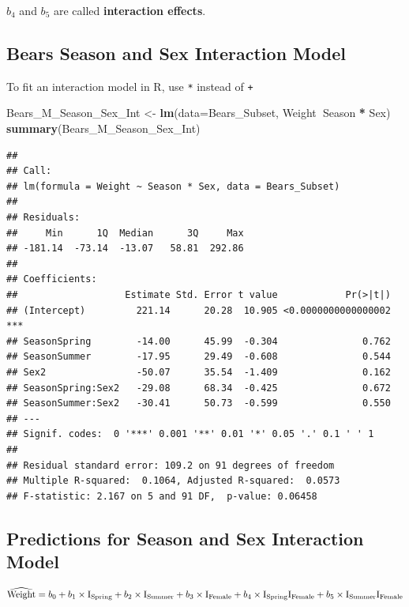 \documentclass[]{book}
\newenvironment{Shaded}{\begin{snugshade}}{\end{snugshade}}
\newcommand{\KeywordTok}[1]{\textcolor[rgb]{0.13,0.29,0.53}{\textbf{#1}}}
\newcommand{\DataTypeTok}[1]{\textcolor[rgb]{0.13,0.29,0.53}{#1}}
\newcommand{\StringTok}[1]{\textcolor[rgb]{0.31,0.60,0.02}{#1}}
\newcommand{\OperatorTok}[1]{\textcolor[rgb]{0.81,0.36,0.00}{\textbf{#1}}}
\newcommand{\NormalTok}[1]{#1}
\begin{document}
\(b_4\) and \(b_5\) are called \textbf{interaction effects}.

\subsection{Bears Season and Sex Interaction
Model}\label{bears-season-and-sex-interaction-model}

To fit an interaction model in R, use \texttt{*} instead of \texttt{+}

\begin{Shaded}
\begin{Highlighting}[]
\NormalTok{Bears_M_Season_Sex_Int <-}\StringTok{ }\KeywordTok{lm}\NormalTok{(}\DataTypeTok{data=}\NormalTok{Bears_Subset, Weight}\OperatorTok{~}\NormalTok{Season }\OperatorTok{*}\StringTok{ }\NormalTok{Sex)}
\KeywordTok{summary}\NormalTok{(Bears_M_Season_Sex_Int)}
\end{Highlighting}
\end{Shaded}

\begin{verbatim}
## 
## Call:
## lm(formula = Weight ~ Season * Sex, data = Bears_Subset)
## 
## Residuals:
##     Min      1Q  Median      3Q     Max 
## -181.14  -73.14  -13.07   58.81  292.86 
## 
## Coefficients:
##                   Estimate Std. Error t value            Pr(>|t|)    
## (Intercept)         221.14      20.28  10.905 <0.0000000000000002 ***
## SeasonSpring        -14.00      45.99  -0.304               0.762    
## SeasonSummer        -17.95      29.49  -0.608               0.544    
## Sex2                -50.07      35.54  -1.409               0.162    
## SeasonSpring:Sex2   -29.08      68.34  -0.425               0.672    
## SeasonSummer:Sex2   -30.41      50.73  -0.599               0.550    
## ---
## Signif. codes:  0 '***' 0.001 '**' 0.01 '*' 0.05 '.' 0.1 ' ' 1
## 
## Residual standard error: 109.2 on 91 degrees of freedom
## Multiple R-squared:  0.1064, Adjusted R-squared:  0.0573 
## F-statistic: 2.167 on 5 and 91 DF,  p-value: 0.06458
\end{verbatim}

\subsection{Predictions for Season and Sex Interaction
Model}\label{predictions-for-season-and-sex-interaction-model}

\[\widehat{\text{Weight}} = b_0 + b_1 \times\text{I}_{\text{Spring}} + b_2\times\text{I}_{\text{Summer}} +b_3\times\text{I}_{\text{Female}}\\ +b_4\times\text{I}_{\text{Spring}}\text{I}_{\text{Female}} +b_5\times\text{I}_{\text{Summer}}\text{I}_{\text{Female}}\]
\end{document}
